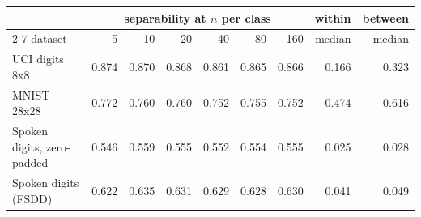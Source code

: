 \begin{tabular}{lrrrrrrrr}
\toprule
& \multicolumn{6}{c}{separability at $n$ per class} & within & between \\
\cmidrule(lr){2-7}
dataset & 5 & 10 & 20 & 40 & 80 & 160 & median & median \\
\midrule
UCI digits 8x8 & 0.874 & 0.870 & 0.868 & 0.861 & 0.865 & 0.866 & 0.166 & 0.323 \\
MNIST 28x28 & 0.772 & 0.760 & 0.760 & 0.752 & 0.755 & 0.752 & 0.474 & 0.616 \\
Spoken digits, zero-padded & 0.546 & 0.559 & 0.555 & 0.552 & 0.554 & 0.555 & 0.025 & 0.028 \\
Spoken digits (FSDD) & 0.622 & 0.635 & 0.631 & 0.629 & 0.628 & 0.630 & 0.041 & 0.049 \\
\bottomrule
\end{tabular}
